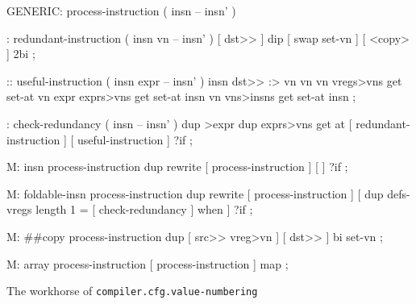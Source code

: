 \centering

  \begin{factorcode}
    GENERIC: process-instruction ( insn -- insn' )

    : redundant-instruction ( insn vn -- insn' )
        [ dst>> ] dip [ swap set-vn ] [ <copy> ] 2bi ;

    :: useful-instruction ( insn expr -- insn' )
        insn dst>> :> vn
        vn vn vregs>vns get set-at
        vn expr exprs>vns get set-at
        insn vn vns>insns get set-at
        insn ;

    : check-redundancy ( insn -- insn' )
        dup >expr dup exprs>vns get at
        [ redundant-instruction ] [ useful-instruction ] ?if ;

    M: insn process-instruction
        dup rewrite [ process-instruction ] [ ] ?if ;

    M: foldable-insn process-instruction
        dup rewrite
        [ process-instruction ]
        [ dup defs-vregs length 1 = [ check-redundancy ] when ] ?if ;

    M: ##copy process-instruction
        dup [ src>> vreg>vn ] [ dst>> ] bi set-vn ;

    M: array process-instruction
        [ process-instruction ] map ;
  \end{factorcode}

\caption{The workhorse of \texttt{compiler.cfg.value-numbering}}
